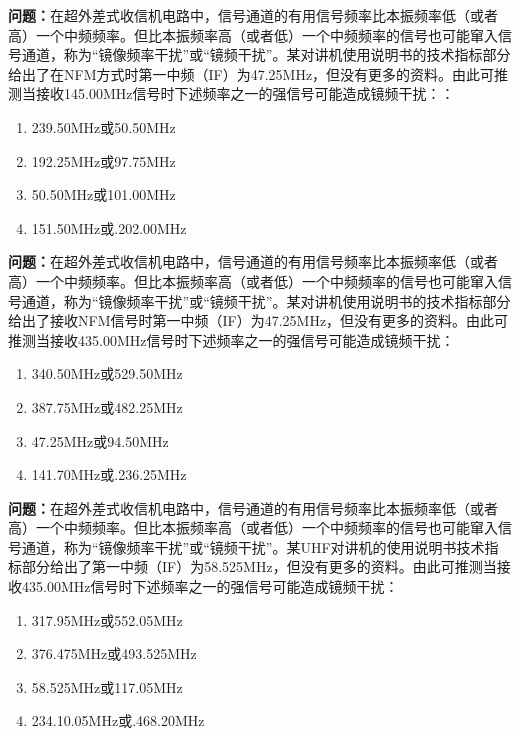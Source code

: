 \bigskip


\noindent\textbf{问题：}在超外差式收信机电路中，信号通道的有用信号频率比本振频率低（或者高）一个中频频率。但比本振频率高（或者低）一个中频频率的信号也可能窜入信号通道，称为“镜像频率干扰”或“镜频干扰”。某对讲机使用说明书的技术指标部分给出了在NFM方式时第一中频（IF）为47.25MHz，但没有更多的资料。由此可推测当接收145.00MHz信号时下述频率之一的强信号可能造成镜频干扰：：
\begin{enumerate}[label=\Alph*), leftmargin=3em]
\item 239.50MHz或50.50MHz
\item 192.25MHz或97.75MHz
\item 50.50MHz或101.00MHz
\item 151.50MHz或.202.00MHz
\end{enumerate}

\bigskip


\noindent\textbf{问题：}在超外差式收信机电路中，信号通道的有用信号频率比本振频率低（或者高）一个中频频率。但比本振频率高（或者低）一个中频频率的信号也可能窜入信号通道，称为“镜像频率干扰”或“镜频干扰”。某对讲机使用说明书的技术指标部分给出了接收NFM信号时第一中频（IF）为47.25MHz，但没有更多的资料。由此可推测当接收435.00MHz信号时下述频率之一的强信号可能造成镜频干扰：
\begin{enumerate}[label=\Alph*), leftmargin=3em]
\item 340.50MHz或529.50MHz
\item 387.75MHz或482.25MHz
\item 47.25MHz或94.50MHz
\item 141.70MHz或.236.25MHz
\end{enumerate}

\bigskip


\noindent\textbf{问题：}在超外差式收信机电路中，信号通道的有用信号频率比本振频率低（或者高）一个中频频率。但比本振频率高（或者低）一个中频频率的信号也可能窜入信号通道，称为“镜像频率干扰”或“镜频干扰”。某UHF对讲机的使用说明书技术指标部分给出了第一中频（IF）为58.525MHz，但没有更多的资料。由此可推测当接收435.00MHz信号时下述频率之一的强信号可能造成镜频干扰：
\begin{enumerate}[label=\Alph*), leftmargin=3em]
\item 317.95MHz或552.05MHz
\item 376.475MHz或493.525MHz
\item 58.525MHz或117.05MHz
\item 234.10.05MHz或.468.20MHz
\end{enumerate}

